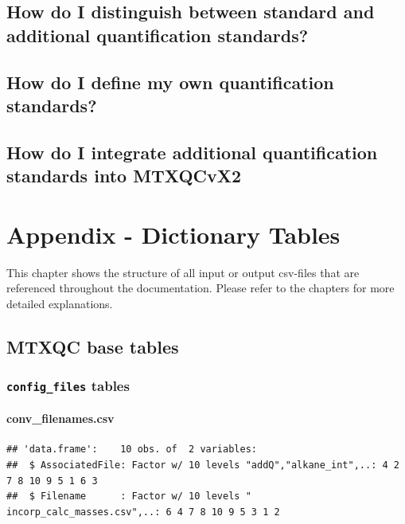 \documentclass[]{book}
\theoremstyle{definition}
\theoremstyle{definition}
\theoremstyle{definition}
\theoremstyle{remark}
\begin{document}
\section{How do I distinguish between standard and additional
quantification standards?}\label{quantquant}

\section{How do I define my own quantification
standards?}\label{quantind}

\section{How do I integrate additional quantification standards into
MTXQCvX2}\label{addqadds}

\chapter{Appendix - Dictionary Tables}\label{tables}

This chapter shows the structure of all input or output csv-files that
are referenced throughout the documentation. Please refer to the
chapters for more detailed explanations.

\section{MTXQC base tables}\label{mtxqc-base-tables}

\subsection{\texorpdfstring{\texttt{config\_files}
tables}{config\_files tables}}\label{config_files-tables}

\subsubsection{conv\_filenames.csv}\label{filenames}

\begin{verbatim}
## 'data.frame':    10 obs. of  2 variables:
##  $ AssociatedFile: Factor w/ 10 levels "addQ","alkane_int",..: 4 2 7 8 10 9 5 1 6 3
##  $ Filename      : Factor w/ 10 levels " incorp_calc_masses.csv",..: 6 4 7 8 10 9 5 3 1 2
\end{verbatim}

\end{document}
